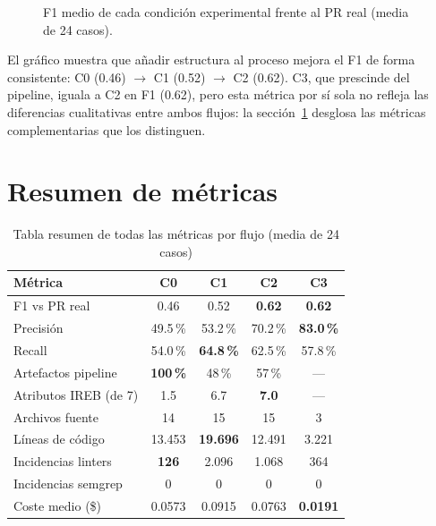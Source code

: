 \begin{figure}[htbp]
\centering
{}
\caption{F1 medio de cada condici\'on experimental frente al PR real (media de 24 casos).}
\label{fig:barras-4flujos}
\end{figure}

El gr\'afico muestra que a\~nadir estructura al proceso mejora el F1 de forma consistente: C0 (0.46) $\rightarrow$ C1 (0.52) $\rightarrow$ C2 (0.62). C3, que prescinde del pipeline, iguala a C2 en F1 (0.62), pero esta m\'etrica por s\'i sola no refleja las diferencias cualitativas entre ambos flujos: la secci\'on~\ref{sec:resumen-metricas} desglosa las m\'etricas complementarias que los distinguen.

\FloatBarrier
\section{Resumen de m\'etricas}
\label{sec:resumen-metricas}

\begin{table}[htbp]
\centering
\caption{Tabla resumen de todas las m\'etricas por flujo (media de 24 casos)}
\label{tab:resumen-metricas}
\begin{tabular}{lcccc}
\toprule
\textbf{M\'etrica} & \textbf{C0} & \textbf{C1} & \textbf{C2} & \textbf{C3} \\
\midrule
F1 vs PR real & 0.46 & 0.52 & \textbf{0.62} & \textbf{0.62} \\
Precisi\'on & 49.5\,\% & 53.2\,\% & 70.2\,\% & \textbf{83.0\,\%} \\
Recall & 54.0\,\% & \textbf{64.8\,\%} & 62.5\,\% & 57.8\,\% \\
\midrule
Artefactos pipeline & \textbf{100\,\%} & 48\,\% & 57\,\% & --- \\
Atributos IREB (de 7) & 1.5 & 6.7 & \textbf{7.0} & --- \\
\midrule
Archivos fuente & 14 & 15 & 15 & 3 \\
L\'ineas de c\'odigo & 13.453 & \textbf{19.696} & 12.491 & 3.221 \\
Incidencias linters & \textbf{126} & 2.096 & 1.068 & 364 \\
Incidencias semgrep & 0 & 0 & 0 & 0 \\
\midrule
Coste medio (\$) & 0.0573 & 0.0915 & 0.0763 & \textbf{0.0191} \\
\bottomrule
\end{tabular}
\end{table}